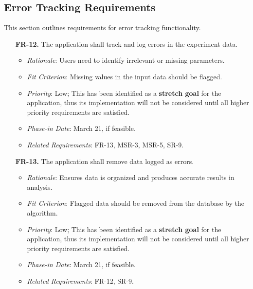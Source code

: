 \documentclass[12pt]{article}
\begin{document}
\subsection{Error Tracking Requirements}
This section outlines requirements for error tracking functionality.
\begin{enumerate}
  \item[\textbf{FR-12.}] The application shall track and log errors in the experiment data.
  \begin{itemize}
    \item \textit{Rationale}: Users need to identify irrelevant or missing parameters.
    \item \textit{Fit Criterion}: Missing values in the input data should be flagged.
    \item \textit{Priority}: Low; This has been identified as a \textbf{stretch goal} for
    the application, thus its implementation will not be considered until all higher
    priority requirements are satisfied.
    \item \textit{Phase-in Date}: March 21, if feasible.
    \item \textit{Related Requirements}: FR-13, MSR-3, MSR-5, SR-9.
  \end{itemize}
  \item[\textbf{FR-13.}] The application shall remove data logged as errors.
  \begin{itemize}
    \item \textit{Rationale}: Ensures data is organized and produces accurate results in analysis.
    \item \textit{Fit Criterion}: Flagged data should be removed from the database by the algorithm.
    \item \textit{Priority}: Low; This has been identified as a \textbf{stretch goal} for
    the application, thus its implementation will not be considered until all
    higher priority requirements are satisfied.
    \item \textit{Phase-in Date}: March 21, if feasible.
    \item \textit{Related Requirements}: FR-12, SR-9.
  \end{itemize}
\end{enumerate}
\end{document}
